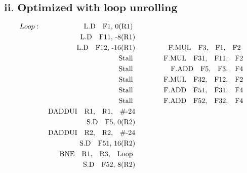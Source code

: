 \documentclass{tufte-handout}
\begin{document}
	\subsection{$\textbf{ii. Optimized with loop unrolling}$}
		\begin{alignat*}{3}
			Loop : & & \mbox{ L.D\quad F1, 0(R1) }             \quad\quad\quad       &&    \\
			       & & \mbox{ L.D\quad F11, -8(R1)}             \quad\quad\quad       &&    \\
			       & & \mbox{ L.D\quad F12, -16(R1)}             \quad\quad\quad       &&  \mbox{ F.MUL\quad F3,\quad F1,\quad F2 }   \\
			       & & \mbox{ Stall }             \quad\quad\quad       && \mbox{F.MUL\quad F31,\quad F11,\quad F2}   \\
			       & & \mbox{ Stall }             \quad\quad\quad       && \mbox{F.ADD\quad F5,\quad F3,\quad F4}   \\
			       & & \mbox{ Stall }             \quad\quad\quad       && \mbox{F.MUL\quad F32,\quad F12,\quad F2}   \\
			       & & \mbox{ Stall }             \quad\quad\quad       && \mbox{F.ADD\quad F51,\quad F31,\quad F4}   \\
			       & & \mbox{ Stall }             \quad\quad\quad       &&   \mbox{F.ADD\quad F52,\quad F32,\quad F4} \\
			       & & \mbox{ DADDUI\quad R1,\quad R1,\quad \#-24}             \quad\quad\quad       &&    \\
			       & & \mbox{ S.D\quad F5, 0(R2)}             \quad\quad\quad       &&    \\
			       & & \mbox{ DADDUI\quad R2,\quad R2,\quad \#-24}             \quad\quad\quad       &&    \\
			       & & \mbox{ S.D\quad F51, 16(R2)}             \quad\quad\quad       &&    \\
			       & & \mbox{ BNE\quad R1,\quad R3,\quad Loop }             \quad\quad\quad       &&    \\
			       & & \mbox{ S.D\quad F52, 8(R2)}             \quad\quad\quad       &&    \\
		\end{alignat*}
		
		

		
  
  
  
  
\end{document}
